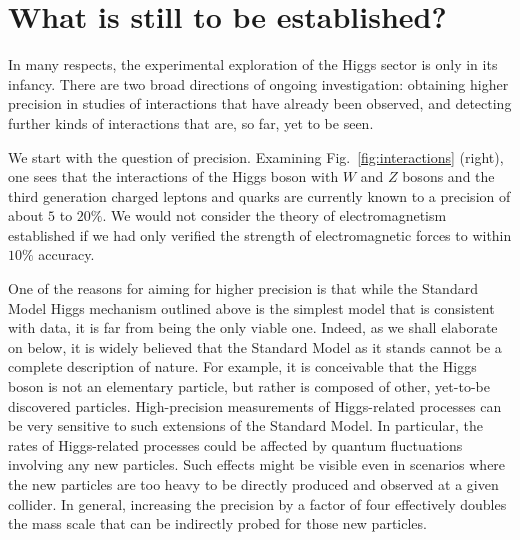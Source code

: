 \documentclass[12pt]{article}
\begin{document}
\section{What is still to be established?}

In many respects, the experimental exploration of the Higgs sector is
only in its infancy.
%
There are two broad directions of ongoing investigation: obtaining
higher precision in studies of interactions that have already been
observed, and detecting further kinds of interactions that are, so
far, yet to be seen.
% 

We start with the question of precision.
%
Examining Fig.~\ref{fig:interactions} (right), one sees that the
interactions of the Higgs boson with $W$ and $Z$ bosons and the third
generation charged leptons and quarks are currently known to a
precision of about $5$ to $20\%$.
%
We would not consider the theory of electromagnetism established if we had only
verified the strength of electromagnetic forces to within $10\%$
accuracy.

One of the reasons for aiming for higher precision is that while the
Standard Model Higgs mechanism outlined above is the simplest model
that is consistent with data, it is far from being the only viable
one.
%
Indeed, as we shall elaborate on below, it is widely believed that the
Standard Model as it stands cannot be a complete description of nature.
%
For example, it is conceivable that the Higgs boson is not an
elementary particle, but rather is composed of other, yet-to-be
discovered particles.
%
High-precision measurements of Higgs-related processes can be very
sensitive to such extensions of the Standard Model.
%
In particular, the rates of Higgs-related processes could be affected
by quantum fluctuations involving any new particles. Such effects
might be visible even in scenarios where the new particles are too
heavy to be directly produced and observed at a given collider.
%
In general, increasing the precision by a factor of four effectively
doubles the mass scale that can be indirectly probed for those new
particles.
%
\end{document}
